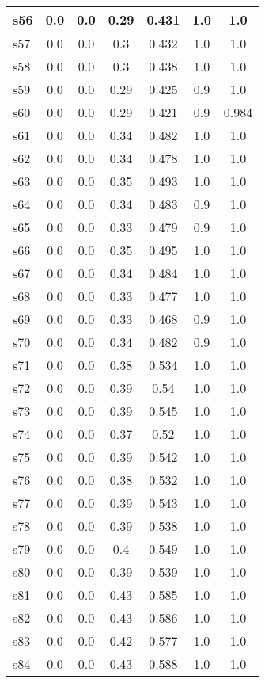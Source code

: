\documentclass{article}
\begin{document}
\begin{tabular}{|l|c|c|c|c|c|c|}
\hline
s56 &0.0 & 0.0 & 0.29 & 0.431 & 1.0 & 1.0\\
\hline
s57 &0.0 & 0.0 & 0.3 & 0.432 & 1.0 & 1.0\\
\hline
s58 &0.0 & 0.0 & 0.3 & 0.438 & 1.0 & 1.0\\
\hline
s59 &0.0 & 0.0 & 0.29 & 0.425 & 0.9 & 1.0\\
\hline
s60 &0.0 & 0.0 & 0.29 & 0.421 & 0.9 & 0.984\\
\hline
s61 &0.0 & 0.0 & 0.34 & 0.482 & 1.0 & 1.0\\
\hline
s62 &0.0 & 0.0 & 0.34 & 0.478 & 1.0 & 1.0\\
\hline
s63 &0.0 & 0.0 & 0.35 & 0.493 & 1.0 & 1.0\\
\hline
s64 &0.0 & 0.0 & 0.34 & 0.483 & 0.9 & 1.0\\
\hline
s65 &0.0 & 0.0 & 0.33 & 0.479 & 0.9 & 1.0\\
\hline
s66 &0.0 & 0.0 & 0.35 & 0.495 & 1.0 & 1.0\\
\hline
s67 &0.0 & 0.0 & 0.34 & 0.484 & 1.0 & 1.0\\
\hline
s68 &0.0 & 0.0 & 0.33 & 0.477 & 1.0 & 1.0\\
\hline
s69 &0.0 & 0.0 & 0.33 & 0.468 & 0.9 & 1.0\\
\hline
s70 &0.0 & 0.0 & 0.34 & 0.482 & 0.9 & 1.0\\
\hline
s71 &0.0 & 0.0 & 0.38 & 0.534 & 1.0 & 1.0\\
\hline
s72 &0.0 & 0.0 & 0.39 & 0.54 & 1.0 & 1.0\\
\hline
s73 &0.0 & 0.0 & 0.39 & 0.545 & 1.0 & 1.0\\
\hline
s74 &0.0 & 0.0 & 0.37 & 0.52 & 1.0 & 1.0\\
\hline
s75 &0.0 & 0.0 & 0.39 & 0.542 & 1.0 & 1.0\\
\hline
s76 &0.0 & 0.0 & 0.38 & 0.532 & 1.0 & 1.0\\
\hline
s77 &0.0 & 0.0 & 0.39 & 0.543 & 1.0 & 1.0\\
\hline
s78 &0.0 & 0.0 & 0.39 & 0.538 & 1.0 & 1.0\\
\hline
s79 &0.0 & 0.0 & 0.4 & 0.549 & 1.0 & 1.0\\
\hline
s80 &0.0 & 0.0 & 0.39 & 0.539 & 1.0 & 1.0\\
\hline
s81 &0.0 & 0.0 & 0.43 & 0.585 & 1.0 & 1.0\\
\hline
s82 &0.0 & 0.0 & 0.43 & 0.586 & 1.0 & 1.0\\
\hline
s83 &0.0 & 0.0 & 0.42 & 0.577 & 1.0 & 1.0\\
\hline
s84 &0.0 & 0.0 & 0.43 & 0.588 & 1.0 & 1.0\\

\end{tabular}
\end{document}
